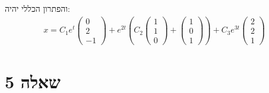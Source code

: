 \documentclass{article}
\begin{document}
והפתרון הכללי יהיה:
\begin{align*}
    x= C_1e^t\begin{pmatrix}
                 0 \\
                 2 \\
                 -1
             \end{pmatrix}+e^{2t}(C_2\begin{pmatrix}
                                         1 \\
                                         1 \\
                                         0
                                     \end{pmatrix}+\begin{pmatrix}
                                                       1 \\
                                                       0 \\
                                                       1
                                                   \end{pmatrix})+C_3e^{3t}\begin{pmatrix}
                                                                               2 \\
                                                                               2 \\
                                                                               1
                                                                           \end{pmatrix}
\end{align*}

\pagebreak

\section*{שאלה 5}
\end{document}
